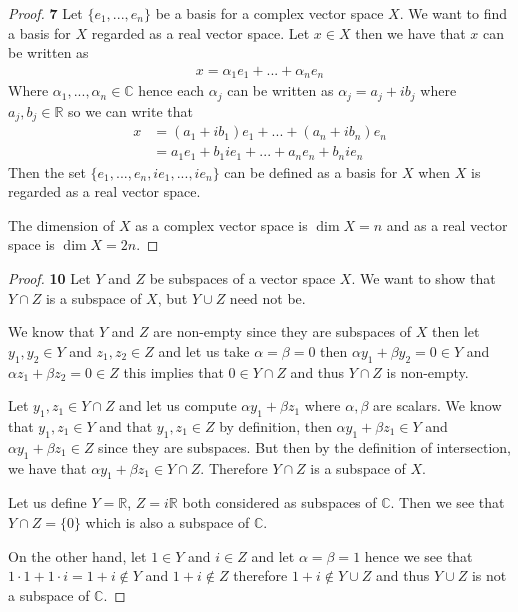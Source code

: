 \documentclass[11pt]{article}
\newcommand{\R}{\mathbb{R}}
\theoremstyle{definition}
\begin{document}
\begin{proof}{\textbf{7}}
    Let $\{e_1, ..., e_n\}$ be a basis for a complex vector space $X$. We want
    to find a basis for $X$ regarded as a real vector space. Let $x \in X$
    then we have that $x$ can be written as 
    \begin{align*}
        x = \alpha_1 e_1 + ... + \alpha_n e_n
    \end{align*}
    Where $\alpha_1, ..., \alpha_n \in \mathbb{C}$ hence each $\alpha_j$ can
    be written as $\alpha_j = a_j + i b_j$ where $a_j, b_j \in \R$ so we can
    write that
    \begin{align*}
        x &= (a_1 + i b_1) e_1 + ... + (a_n + ib_n) e_n\\
          &= a_1e_1 + b_1 ie_1  + ... + a_ne_n + b_n ie_n
    \end{align*}
    Then the set $\{e_1, ..., e_n, ie_1, ..., ie_n\}$ can be defined as a basis
    for $X$ when $X$ is regarded as a real vector space.

    The dimension of $X$ as a complex vector space is $\dim X = n$ and 
    as a real vector space is $\dim X = 2n$.
\end{proof}
\cleardoublepage
\begin{proof}{\textbf{10}}
    Let $Y$ and $Z$ be subspaces of a vector space $X$. We want to show that
    $Y \cap Z$ is a subspace of $X$, but $Y \cup Z$ need not be.

    We know that $Y$ and $Z$ are non-empty since they are subspaces of $X$
    then let $y_1, y_2 \in Y$ and $z_1, z_2 \in Z$ and let us take
    $\alpha=\beta= 0$ then $\alpha y_1 + \beta y_2 = 0 \in Y$ and 
    $\alpha z_1 + \beta z_2 = 0 \in Z$ this implies that $0 \in Y \cap Z$
    and thus $Y \cap Z$ is non-empty.

    Let $y_1, z_1 \in Y \cap Z$ and let us compute $\alpha y_1 + \beta z_1$
    where $\alpha, \beta$ are scalars. We know that $y_1, z_1 \in Y$ and 
    that $y_1, z_1 \in Z$ by definition, then $\alpha y_1 + \beta z_1 \in Y$
    and  $\alpha y_1 + \beta z_1 \in Z$ since they are subspaces. But then 
    by the definition of intersection, we have that
    $\alpha y_1 + \beta z_1 \in Y \cap Z$. Therefore $Y \cap Z$ is a subspace
    of $X$.
    
    Let us define $Y = \R$, $Z = i\R$ both considered as subspaces of
    $\mathbb{C}$. Then we see that $Y \cap Z = \{0\}$ which is also
    a subspace of $\mathbb{C}$.
    
    On the other hand, let $1 \in Y$ and $i \in Z$ and let $\alpha=\beta = 1$
    hence we see that $1\cdot 1 + 1\cdot i = 1 + i \not\in Y$ and
    $1 + i \not\in Z$ therefore $1 + i \not\in Y \cup Z$ and thus $Y \cup Z$
    is not a subspace of $\mathbb{C}$.    
\end{proof}
\end{document}
